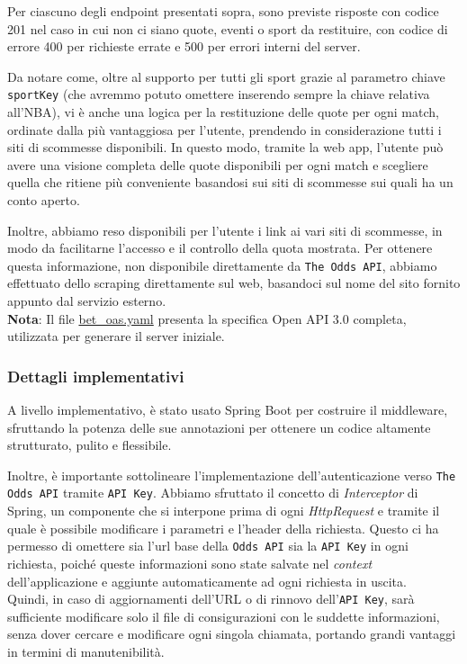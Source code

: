 \noindent Per ciascuno degli endpoint presentati sopra, sono previste risposte con codice 201 nel caso in cui non ci siano quote, eventi o sport da restituire, con codice di errore 400 per richieste errate e 500 per errori interni del server.

Da notare come, oltre al supporto per tutti gli sport grazie al parametro chiave \texttt{sportKey} (che avremmo potuto omettere inserendo sempre la chiave relativa all'NBA), vi è anche una logica per la restituzione delle quote per ogni match, ordinate dalla più vantaggiosa per l'utente, prendendo in considerazione tutti i siti di scommesse disponibili. In questo modo, tramite la web app, l'utente può avere una visione completa delle quote disponibili per ogni match e scegliere quella che ritiene più conveniente basandosi sui siti di scommesse sui quali ha un conto aperto.

Inoltre, abbiamo reso disponibili per l'utente i link ai vari siti di scommesse, in modo da facilitarne l'accesso e il controllo della quota mostrata. Per ottenere questa informazione, non disponibile direttamente da \texttt{The Odds API}, abbiamo effettuato dello scraping direttamente sul web, basandoci sul nome del sito fornito appunto dal servizio esterno.\\

\noindent \textbf{Nota}: Il file \href{run:../documents/bet_oas.yaml}{bet\_oas.yaml} presenta la specifica Open API 3.0 completa, utilizzata per generare il server iniziale.


\subsubsection{Dettagli implementativi}
A livello implementativo, è stato usato Spring Boot per costruire il middleware, sfruttando la potenza delle sue annotazioni per ottenere un codice altamente strutturato, pulito e flessibile. 

Inoltre, è importante sottolineare l'implementazione dell'autenticazione verso \texttt{The Odds API} tramite \texttt{API Key}. Abbiamo sfruttato il concetto di \textit{Interceptor} di Spring, un componente che si interpone prima di ogni \textit{HttpRequest} e tramite il quale è possibile modificare i parametri e l'header della richiesta. Questo ci ha permesso di omettere sia l'url base della \texttt{Odds API} sia la \texttt{API Key} in ogni richiesta, poiché queste informazioni sono state salvate nel \textit{context} dell'applicazione e aggiunte automaticamente ad ogni richiesta in uscita.\\
Quindi, in caso di aggiornamenti dell'URL o di rinnovo dell'\texttt{API Key}, sarà sufficiente modificare solo il file di consigurazioni con le suddette informazioni, senza dover cercare e modificare ogni singola chiamata, portando grandi vantaggi in termini di manutenibilità.


